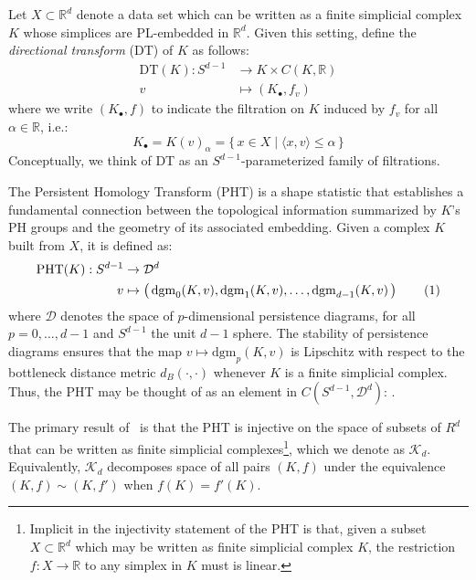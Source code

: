 \documentclass[10pt]{article}
\numberwithin{equation}{section}
\newcommand{\+}{%
	\raisebox{0.18ex}{\scaleobj{0.55}{+}}
}
\theoremstyle{definition}
\newcommand\numberthis{\addtocounter{equation}{1}\tag{\theequation}}
\begin{document}
Let $X \subset \mathbb{R}^d$ denote a data set which can be written as a finite simplicial complex $K$ whose simplices are PL-embedded in $\mathbb{R}^d$. Given this setting,  define the \emph{directional transform} (DT) of $K$ as follows:
\begin{align*}\label{eq:pht}
	\mathrm{DT}(K): S^{d-1} &\to  K \times C(K, \mathbb{R}) \\
	v &\mapsto (K_\bullet, f_v)
\end{align*}
where we write $(K_\bullet, f)$ to indicate the filtration on $K$ induced by $f_v$ for all $\alpha \in \mathbb{R}$, i.e.: 
\begin{equation}
	K_\bullet = K(v)_\alpha = \{\, x \in X \mid \langle x, v \rangle \leq \alpha  \,\} %
\end{equation}
Conceptually, we think of DT as an $S^{d-1}$-parameterized family of filtrations. 


The Persistent Homology Transform (PHT) is a shape statistic that establishes a fundamental connection between the topological information summarized by $K$'s PH groups and the geometry of its associated embedding. Given a complex $K$ built from $X$, it is defined as: 
\begin{align*}\label{eq:pht}
	\mathrm{PHT}(K): S^{d-1} &\to \mathcal{D}^d \\
	v &\mapsto \left( \, \mathrm{dgm}_0(K, v), \mathrm{dgm}_1(K, v), \dots, \mathrm{dgm}_{d-1}(K, v) \, \right)\numberthis
\end{align*}
where $\mathcal{D}$ denotes the space of $p$-dimensional persistence diagrams, for all $p = 0, \dots, d-1$ and $S^{d-1}$ the unit $d-1$ sphere. The stability of persistence diagrams ensures that the map $v \mapsto \mathrm{dgm}_p(K, v)$ is Lipschitz with respect to the bottleneck distance metric $d_B(\cdot, \cdot)$ whenever $K$ is a finite simplicial complex. 
Thus, the PHT may be thought of as an element in $C(S^{d-1}, \mathcal{D}^d)$: . 


The primary result of~\cite{} is that the PHT is injective on the space of subsets of $R^d$ that can be written as finite simplicial complexes\footnote{Implicit in the injectivity statement of the PHT is that, given a subset $X \subset \mathbb{R}^d$ which may be written as finite simplicial complex $K$, the restriction $f: X \to \mathbb{R}$ to any simplex in $K$ must is linear.}, which we denote as $\mathcal{K}_d$. 
Equivalently, $\mathcal{K}_d$ decomposes space of all pairs $(K, f)$ under the equivalence $(K, f) \sim (K,f')$ when $f(K) = f'(K)$.
\end{document}
